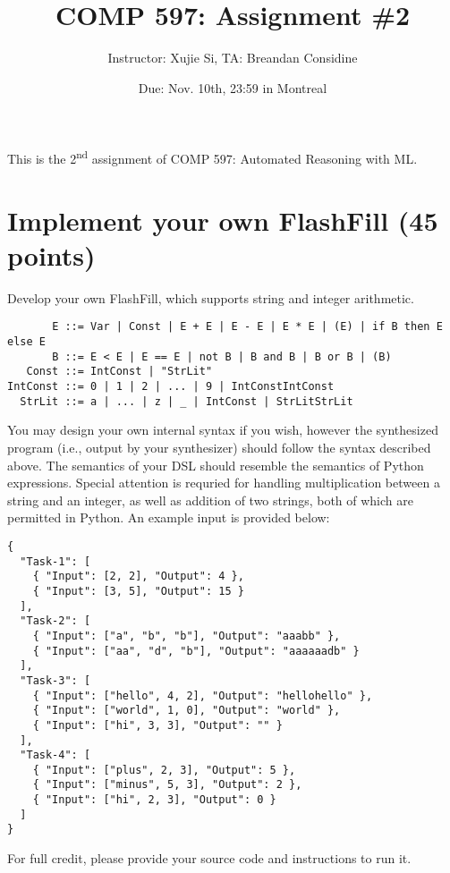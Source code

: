 \documentclass[11pt]{article}
\author{Instructor: Xujie Si, TA: Breandan Considine}
\date{Due: Nov. 10th, 23:59 in Montreal}
\title{COMP 597: Assignment \#2}
\begin{document}
    \maketitle
    \noindent This is the 2\textsuperscript{nd} assignment of COMP 597: Automated Reasoning with ML.

    \section{Implement your own FlashFill (45 points)}

    Develop your own FlashFill, which supports string and integer arithmetic.

    \begin{footnotesize}
    \begin{verbatim}
       E ::= Var | Const | E + E | E - E | E * E | (E) | if B then E else E
       B ::= E < E | E == E | not B | B and B | B or B | (B)
   Const ::= IntConst | "StrLit"
IntConst ::= 0 | 1 | 2 | ... | 9 | IntConstIntConst
  StrLit ::= a | ... | z | _ | IntConst | StrLitStrLit
    \end{verbatim}
    \end{footnotesize}

    \noindent You may design your own internal syntax if you wish, however the synthesized program (i.e., output by your synthesizer) should follow the syntax described above. The semantics of your DSL should resemble the semantics of Python expressions. Special attention is requried for handling multiplication between a string and an integer, as well as addition of two strings, both of which are permitted in Python. An example input is provided below:

    \begin{lstlisting}[basicstyle=\ttfamily\tiny]
{
  "Task-1": [
    { "Input": [2, 2], "Output": 4 },
    { "Input": [3, 5], "Output": 15 }
  ],
  "Task-2": [
    { "Input": ["a", "b", "b"], "Output": "aaabb" },
    { "Input": ["aa", "d", "b"], "Output": "aaaaaadb" }
  ],
  "Task-3": [
    { "Input": ["hello", 4, 2], "Output": "hellohello" },
    { "Input": ["world", 1, 0], "Output": "world" },
    { "Input": ["hi", 3, 3], "Output": "" }
  ],
  "Task-4": [
    { "Input": ["plus", 2, 3], "Output": 5 },
    { "Input": ["minus", 5, 3], "Output": 2 },
    { "Input": ["hi", 2, 3], "Output": 0 }
  ]
}
    \end{lstlisting}

    \noindent For full credit, please provide your source code and instructions to run it.
\end{document}
